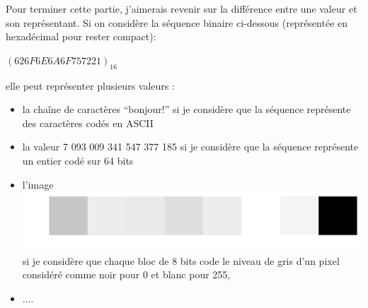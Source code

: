 Pour terminer cette partie, j'aimerais revenir sur la différence entre une valeur et son représentant. Si on considère la séquence binaire ci-dessous (représentée en hexadécimal pour rester compact):
\begin{center}
$(626F6E6A6F757221)_{16}$
\end{center}
elle peut représenter plusieurs valeurs :
\begin{itemize}
\item la chaîne de caractères ``bonjour!'' si je considère que la séquence représente des caractères codés en ASCII
\item la valeur 7 093 009 341 547 377 185 si je considère que la séquence représente un entier codé sur 64 bits
\item l'image \includegraphics[width=0.3\linewidth]{Figs/code_img.pdf} si je considère que chaque bloc de 8 bits code le niveau de gris d'un pixel considéré comme noir pour 0 et blanc pour 255,
\item ....
\end{itemize}






